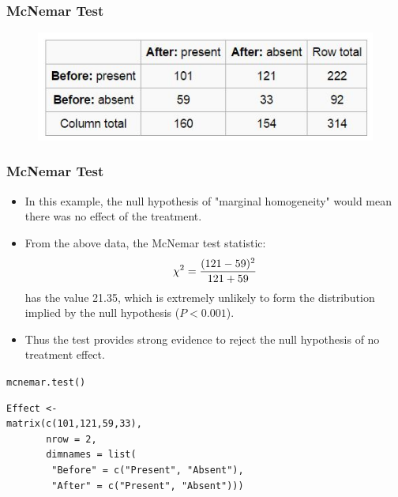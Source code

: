 \documentclass{beamer}
\begin{document}
\begin{frame}
\frametitle{McNemar Test}
\Large
\begin{figure}
\centering
\includegraphics[width=0.99\linewidth]{./mcmenar2}
\end{figure}


\end{frame}
\begin{frame}
\frametitle{McNemar Test}
\Large
\begin{itemize}
\item In this example, the null hypothesis of "marginal homogeneity" would mean there was no effect of the treatment. 
\item From the above data, the McNemar test statistic:
\[\chi^2 = {(121 - 59)^2 \over {121 + 59}}\]
has the value 21.35, which is extremely unlikely to form the distribution implied by the null hypothesis ($P < 0.001$). 
\item Thus the test provides strong evidence to reject the null hypothesis of no treatment effect.
\end{itemize}



\end{frame}
\begin{frame}[fragile]
\large
\texttt{mcnemar.test() }
\begin{framed}
\begin{verbatim}
Effect <-
matrix(c(101,121,59,33),
       nrow = 2,
       dimnames = list(
        "Before" = c("Present", "Absent"),
        "After" = c("Present", "Absent")))

\end{verbatim}
\end{framed}

\end{frame}
\end{document}
